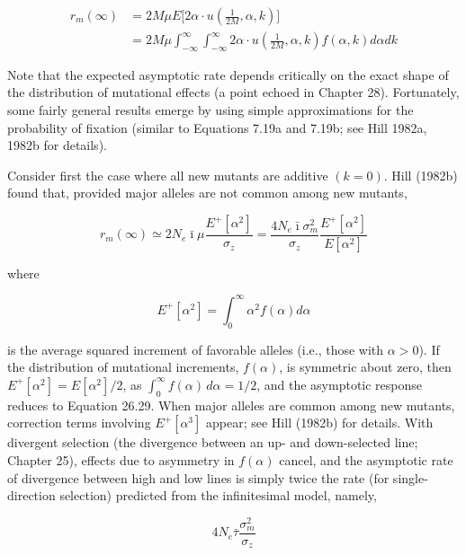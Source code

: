 \documentclass{article}
\begin{document}
{\begin{equation}
\begin{align*}r_{m}(\infty)&=2M\mu E\bigg[2\alpha\cdot u\left(\frac{1}{2M},\alpha,k\right)\bigg]\\&=2M\mu\int_{-\infty}^{\infty}\int_{-\infty}^{\infty}2\alpha\cdot u\left(\frac{1}{2M},\alpha,k\right)f(\alpha,k)d\alpha d k\end{align*}
\tag{26.32}
\label{eq:26_32}
\end{equation}

Note that the expected asymptotic rate depends critically on the exact shape of the distribution of mutational effects (a point echoed in Chapter 28). Fortunately, some fairly general results emerge by using simple approximations for the probability of fixation (similar to Equations 7.19a and 7.19b; see Hill 1982a, 1982b for details).

Consider first the case where all new mutants are additive  $ (k = 0) $. Hill (1982b) found that, provided major alleles are not common among new mutants,

\begin{equation}
r_{m}(\infty)\simeq2N_{e}\bar{\imath}\mu\frac{E^{+}[\alpha^{2}]}{\sigma_{z}}=\frac{4N_{e}\bar{\imath}\sigma_{m}^{2}}{\sigma_{z}}\frac{E^{+}[\alpha^{2}]}{E[\alpha^{2}]}
\tag{26.33a}
\label{eq:26_33a}
\end{equation}

where

\begin{equation}
E^{+}[\alpha^{2}]=\int_{0}^{\infty}\alpha^{2}f(\alpha)d\alpha
\tag{26.33b}
\label{eq:26_33b}
\end{equation}

is the average squared increment of favorable alleles (i.e., those with  $ \alpha > 0 $). If the distribution of mutational increments,  $ f(\alpha) $, is symmetric about zero, then  $ E^{+}[\alpha^2] = E[\alpha^2]/2 $, as  $ \int_0^\infty f(\alpha) \, d\alpha = 1/2 $, and the asymptotic response reduces to Equation 26.29. When major alleles are common among new mutants, correction terms involving  $ E^{+}[\alpha^3] $ appear; see Hill (1982b) for details. With divergent selection (the divergence between an up- and down-selected line; Chapter 25), effects due to asymmetry in  $ f(\alpha) $ cancel, and the asymptotic rate of divergence between high and low lines is simply twice the rate (for single-direction selection) predicted from the infinitesimal model, namely,

\begin{equation}
4N_{e}\bar{\tau}\frac{\sigma_{m}^{2}}{\sigma_{z}}
\tag{26.33c}
\label{eq:26_33c}
\end{equation}

}
\end{document}
